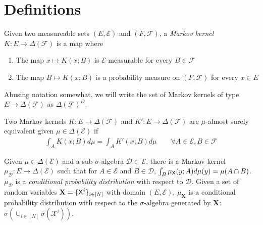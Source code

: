 \section{Definitions}




Given two measureable sets $(E,\mathcal{E})$ and $(F,\mathcal{F})$, a \emph{Markov kernel} $K:E\to \Delta(\mathcal{F})$ is a map where
\begin{enumerate}
    \item The map $x\mapsto K(x;B)$ is $\mathcal{E}$-measurable for every $B\in\mathcal{F}$
    \item The map $B\mapsto K(x;B)$ is a probability measure on $(F,\mathcal{F})$ for every $x\in E$
\end{enumerate}

Abusing notation somewhat, we will write the set of Markov kernels of type $E\to \Delta(\mathcal{F})$ as $\Delta(\mathcal{F})^D$.

Two Markov kernels $K:E\to \Delta(\mathcal{F})$ and $K':E\to \Delta(\mathcal{F})$ are $\mu$-almost surely equivalent given $\mu\in \Delta(\mathcal{E})$ if
\begin{align}
    \int_A K(x;B) d\mu = \int_A K'(x;B) d\mu\qquad\forall A\in \mathcal{E}, B\in\mathcal{F}
\end{align}

Given $\mu\in \Delta(\mathcal{E})$ and a sub-$\sigma$-algebra $\mathcal{D}\subset\mathcal{E}$, there is a Markov kernel $\mu_{\mathcal{D}}:E\to\Delta(\mathcal{E})$ such that for $A\in\mathcal{E}$ and $B\in \mathcal{D}$, $\int_B \mu_{\mathsf{X}}(y;A) d\mu(y) = \mu(A\cap B)$. $\mu_{\mathcal{D}}$ is a \emph{conditional probability distribution} with respect to $\mathcal{D}$. Given a set of random variables $\mathbf{X}=\{\mathsf{X}^i\}_{i\in [N]}$ with domain $(E,\mathcal{E})$, $\mu_{\mathbf{X}}$ is a conditional probability distribution with respect to the $\sigma$-algebra generated by $\mathbf{X}$: $\sigma(\cup_{i\in[N]}\sigma(\mathcal{X}^i))$.


